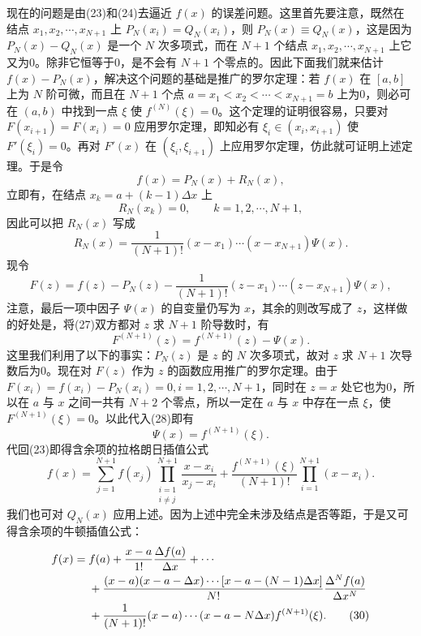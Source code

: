 现在的问题是由(23)和(24)去逼近 $f(x)$ 的误差问题。这里首先要注意，既然在结点 $x_1,x_2,\cdots,x_{N+1}$ 上 $P_N(x_i)=Q_N(x_i)$，则 $P_N(x)\equiv Q_N(x)$，这是因为 $P_N(x)-Q_N(x)$ 是一个 $N$ 次多项式，而在 $N+1$ 个结点 $x_1,x_2,\cdots,x_{N+1}$ 上它又为0。除非它恒等于0，是不会有 $N+1$ 个零点的。因此下面我们就来估计 $f(x)-P_N(x)$，解决这个问题的基础是推广的罗尔定理：若 $f(x)$ 在 $[a,b]$ 上为 $N$ 阶可微，而且在 $N+1$ 个点 $a=x_1<x_2<\cdots<x_{N+1}=b$ 上为0，则必可在 $(a,b)$ 中找到一点 $\xi$ 使 $f^{(N)}(\xi)=0$。这个定理的证明很容易，只要对 $F(x_{i+1})=F(x_i)=0$ 应用罗尔定理，即知必有 $\xi_i\in(x_i,x_{i+1})$ 使 $F'(\xi_i)=0$。再对 $F'(x)$ 在 $(\xi_i,\xi_{i+1})$ 上应用罗尔定理，仿此就可证明上述定理。于是令
\[
 f(x)=P_N(x)+R_N(x),
\]
立即有，在结点 $x_k=a+(k-1)\Delta x$ 上
\[
 R_N(x_k)=0,\qquad k=1,2,\cdots,N+1,
\]
因此可以把 $R_N(x)$ 写成
\[
 R_N(x)=\frac1{(N+1)!}(x-x_1)\cdots(x-x_{N+1})\Psi(x).
\]
现令
\begin{equation}
 F(z)=f(z)-P_N(z)-\frac1{(N+1)!}(z-x_1)\cdots(z-x_{N+1})\Psi(x),
 \tag{27}
\end{equation}
注意，最后一项中因子 $\Psi(x)$ 的自变量仍写为 $x$，其余的则改写成了 $z$，这样做的好处是，将(27)双方都对 $z$ 求 $N+1$ 阶导数时，有
\begin{equation}
 F^{(N+1)}(z)=f^{(N+1)}(z)-\Psi(x).
 \tag{28}
\end{equation}
这里我们利用了以下的事实：$P_N(z)$ 是 $z$ 的 $N$ 次多项式，故对 $z$ 求 $N+1$ 次导数后为0。现在对 $F(z)$ 作为 $z$ 的函数应用推广的罗尔定理。由于 $F(x_i)=f(x_i)-P_N(x_i)=0,i=1,2,\cdots,N+1$，同时在 $z=x$ 处它也为0，所以在 $a$ 与 $x$ 之间一共有 $N+2$ 个零点，所以一定在 $a$ 与 $x$ 中存在一点 $\xi$，使 $F^{(N+1)}(\xi)=0$。以此代入(28)即有
\[
 \Psi(x)=f^{(N+1)}(\xi).
\]
代回(23)即得含余项的拉格朗日插值公式
\begin{equation}
 f(x)=\sum_{j=1}^{N+1}f(x_j)\prod_{\substack{i=1\\i\ne j}}^{N+1}\frac{x-x_i}{x_j-x_i}
 +\frac{f^{(N+1)}(\xi)}{(N+1)!}\prod_{i=1}^{N+1}(x-x_i).
 \tag{29}
\end{equation}
我们也可对 $Q_N(x)$ 应用上述。因为上述中完全未涉及结点是否等距，于是又可得含余项的牛顿插值公式：
\begin{align}
 f(x)={}&f(a)+\frac{x-a}{1!}\frac{\Delta f(a)}{\Delta x}+\cdots\notag\\
 &+\frac{(x-a)(x-a-\Delta x)\cdots[x-a-(N-1)\Delta x]}{N!}
   \frac{\Delta^Nf(a)}{\Delta x^N}\notag\\
 &+\frac1{(N+1)!}(x-a)\cdots(x-a-N\Delta x)f^{(N+1)}(\xi).
 \tag{30}
\end{align}

